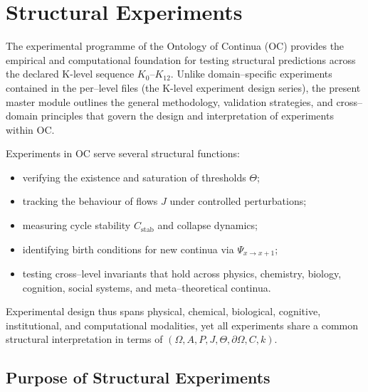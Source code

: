 
\section{Structural Experiments}
\label{sec:experiments-master}

The experimental programme of the Ontology of Continua (OC) provides the
empirical and computational foundation for testing structural predictions
across the declared K-level sequence $K_0$–$K_{12}$.
Unlike domain–specific experiments contained in the per–level files
(the K-level experiment design series), the present master module outlines the
general methodology, validation strategies, and cross–domain principles
that govern the design and interpretation of experiments within OC.

Experiments in OC serve several structural functions:
\begin{itemize}
    \item verifying the existence and saturation of thresholds $\Theta$;
    \item tracking the behaviour of flows $J$ under controlled perturbations;
    \item measuring cycle stability $C_{\mathrm{stab}}$ and collapse dynamics;
    \item identifying birth conditions for new continua via $\Psi_{x\to x+1}$;
    \item testing cross–level invariants that hold across physics, chemistry,
          biology, cognition, social systems, and meta–theoretical continua.
\end{itemize}

Experimental design thus spans physical, chemical, biological, cognitive,
institutional, and computational modalities, yet all experiments share a
common structural interpretation in terms of $(\Omega, A, P, J, \Theta,
\partial\Omega, C, k)$.


\subsection{Purpose of Structural Experiments}

